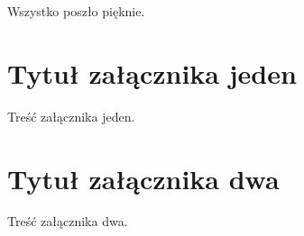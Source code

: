 \documentclass[brudnopis]{xmgr}
\begin{document}
Wszystko poszło pięknie.

\appendix
\chapter{Tytuł załącznika jeden}

Treść załącznika jeden.

\chapter{Tytuł załącznika dwa}

Treść załącznika dwa.




\listoftables

\listoffigures

\oswiadczenie
\end{document}

